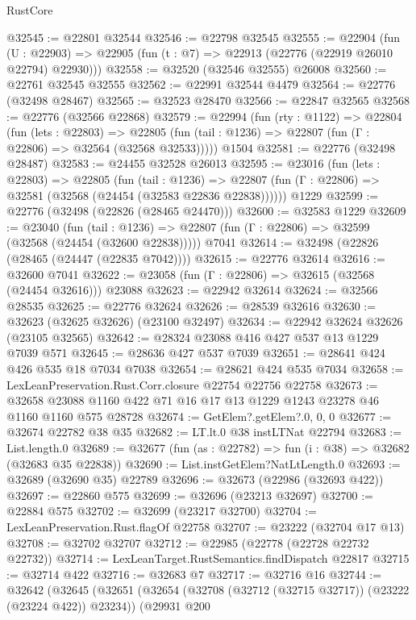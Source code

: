 \begin{lexlean}{RustCore}
\begin{coremodule}
@32545 := @22801 @32544
@32546 := @22798 @32545
@32555 := @22904
    (fun (U : @22903) => @22905 (fun (t : @7) => @22913 (@22776 (@22919 @26010 @22794) @22930)))
@32558 := @32520 (@32546 @32555) @26008
@32560 := @22761 @32545 @32555
@32562 := @22991 @32544 @4479
@32564 := @22776 (@32498 @28467)
@32565 := @32523 @28470
@32566 := @22847 @32565
@32568 := @22776 (@32566 @22868)
@32579 := @22994
    (fun (rty : @1122) =>
    @22804
      (fun (lets : @22803) =>
      @22805 (fun (tail : @1236) => @22807 (fun (Γ : @22806) => @32564 (@32568 @32533)))))
    @1504
@32581 := @22776 (@32498 @28487)
@32583 := @24455 @32528 @26013
@32595 := @23016
    (fun (lets : @22803) =>
    @22805
      (fun (tail : @1236) =>
      @22807 (fun (Γ : @22806) => @32581 (@32568 (@24454 (@32583 @22836 @22838))))))
    @1229
@32599 := @22776 (@32498 (@22826 (@28465 @24470)))
@32600 := @32583 @1229
@32609 := @23040
    (fun (tail : @1236) => @22807 (fun (Γ : @22806) => @32599 (@32568 (@24454 (@32600 @22838)))))
    @7041
@32614 := @32498 (@22826 (@28465 (@24447 (@22835 @7042))))
@32615 := @22776 @32614
@32616 := @32600 @7041
@32622 := @23058 (fun (Γ : @22806) => @32615 (@32568 (@24454 @32616))) @23088
@32623 := @22942 @32614
@32624 := @32566 @28535
@32625 := @22776 @32624
@32626 := @28539 @32616
@32630 := @32623 (@32625 @32626) (@23100 @32497)
@32634 := @22942 @32624 @32626 (@23105 @32565)
@32642 := @28324 @23088 @416 @427 @537 @13 @1229 @7039 @571
@32645 := @28636 @427 @537 @7039
@32651 := @28641 @424 @426 @535 @18 @7034 @7038
@32654 := @28621 @424 @535 @7034
@32658 := LexLeanPreservation.Rust.Corr.closure @22754 @22756 @22758
@32673 := @32658 @23088 @1160 @422 @71 @16 @17 @13 @1229 @1243 @23278 @46 @1160 @1160 @575 @28728
@32674 := GetElem?.getElem?.{0, 0, 0}
@32677 := @32674 @22782 @38 @35
@32682 := LT.lt.{0} @38 instLTNat @22794
@32683 := List.length.{0}
@32689 := @32677 (fun (as : @22782) => fun (i : @38) => @32682 (@32683 @35 @22838))
@32690 := List.instGetElem?NatLtLength.{0}
@32693 := @32689 (@32690 @35) @22789
@32696 := @32673 (@22986 (@32693 @422))
@32697 := @22860 @575
@32699 := @32696 (@23213 @32697)
@32700 := @22884 @575
@32702 := @32699 (@23217 @32700)
@32704 := LexLeanPreservation.Rust.flagOf @22758
@32707 := @23222 (@32704 @17 @13)
@32708 := @32702 @32707
@32712 := @22985 (@22778 (@22728 @22732 @22732))
@32714 := LexLeanTarget.RustSemantics.findDispatch @22817
@32715 := @32714 @422
@32716 := @32683 @7
@32717 := @32716 @16
@32744 := @32642
    (@32645
      (@32651
        (@32654 (@32708 (@32712 (@32715 @32717)) (@23222 (@23224 @422)) @23234))
        (@29931
          @200

\end{coremodule}
\end{lexlean}
